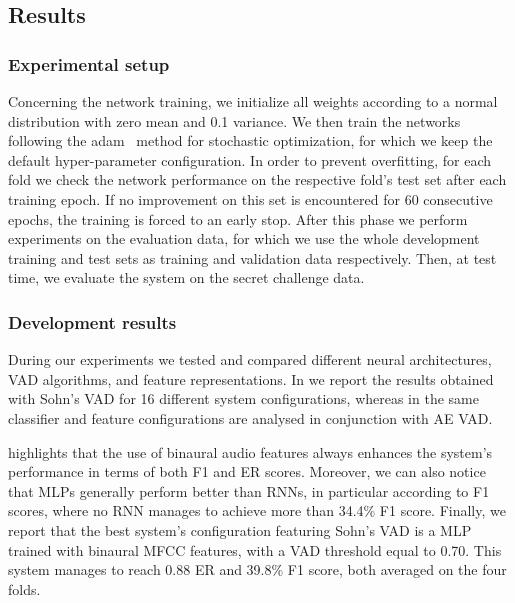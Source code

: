 \subsection{Results}
\subsubsection{Experimental setup}

Concerning the network training, we initialize all weights according to a normal distribution with zero mean and 0.1 variance. We then train the networks following the adam~\cite{kingma2014adam} method for stochastic optimization, for which we keep the default hyper-parameter configuration. In order to prevent overfitting, for each fold we check the network performance on the respective fold's test set after each training epoch. If no improvement on this set is encountered for 60 consecutive epochs, the training is forced to an early stop.
After this phase we perform experiments on the evaluation data, for which we use the whole development training and test sets as training and validation data respectively. Then, at test time, we evaluate the system on the secret challenge data.

\subsubsection{Development results}

During our experiments we tested and compared different neural architectures, VAD algorithms, and feature representations. In  we report the results obtained with Sohn's VAD for 16 different system configurations, whereas in  the same classifier and feature configurations are analysed in conjunction with AE VAD.

 highlights that the use of binaural audio features always enhances the system's performance in terms of both F1 and ER scores. Moreover, we can also notice that MLPs generally perform better than RNNs, in particular according to F1 scores, where no RNN manages to achieve more than 34.4\% F1 score. Finally, we report that the best system's configuration featuring Sohn's VAD is a MLP trained with binaural MFCC features, with a VAD threshold equal to 0.70. This system manages to reach 0.88 ER and 39.8\% F1 score, both averaged on the four folds.

